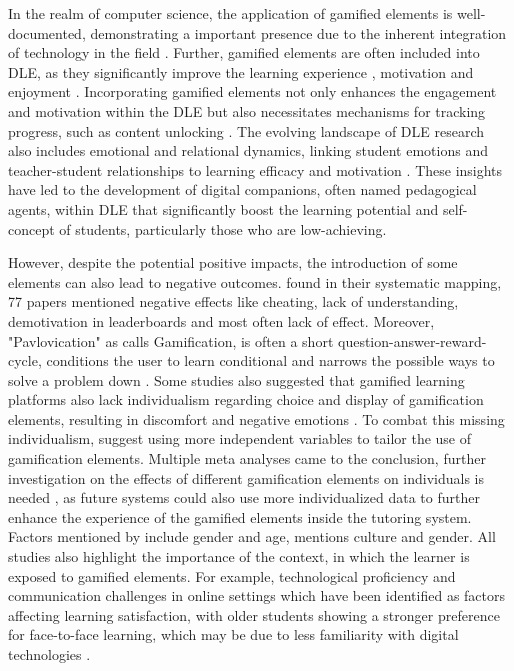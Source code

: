 In the realm of computer science, the application of gamified elements is well-documented, demonstrating a important presence due to the inherent integration of technology in the field \parencite{dichevGamifyingEducationWhat2017}.
Further, gamified elements are often included into DLE, as they significantly improve the learning experience \parencite{dermevalGaTOOntologicalModel2019}, motivation and enjoyment \parencite{gonzalezGamificationIntelligentTutoring2014, jacksonMotivationPerformanceGamebased2013}.
Incorporating gamified elements not only enhances the engagement and motivation within the DLE but also necessitates mechanisms for tracking progress, such as content unlocking \parencite{gonzalezGamificationIntelligentTutoring2014}.
The evolving landscape of DLE research also includes emotional and relational dynamics, linking student emotions and teacher-student relationships to learning efficacy and motivation \parencite{woolfAffectiveTutorsAutomatic2010}.
These insights have led to the development of digital companions, often named pedagogical agents, within DLE that significantly boost the learning potential and self-concept of students, particularly those who are low-achieving.


However, despite the potential positive impacts, the introduction of some elements can also lead to negative outcomes.
\textcite{almeidaSystematicMappingNegative2021} found in their systematic mapping, 77 papers mentioned negative effects like cheating, lack of understanding, demotivation in leaderboards and most often lack of effect.
Moreover, "Pavlovication" as \textcite{klabbersArchitectureGameScience2018} calls Gamification, is often a short question-answer-reward-cycle, conditions the user to learn conditional and narrows the possible ways to solve a problem down \parencite{klabbersArchitectureGameScience2018}.
Some studies also suggested that gamified learning platforms also lack individualism regarding choice and display of gamification elements, resulting in discomfort and negative emotions \parencite{santosDoesGenderStereotype2023}.
To combat this missing individualism, \textcite{oliveiraTailoredGamificationEducation2023,dehghanzadehUsingGamificationSupport2024} suggest using more independent variables to tailor the use of gamification elements.
Multiple meta analyses came to the conclusion, further investigation on the effects of different gamification elements on individuals is needed \textcite{oliveiraTailoredGamificationEducation2023,dehghanzadehUsingGamificationSupport2024,hamariDoesGamificationWork2014}, as future systems could also use more individualized data to further enhance the experience of the gamified elements inside the tutoring system.
Factors mentioned by \textcite{dehghanzadehUsingGamificationSupport2024} include gender and age, \textcite{oliveiraTailoredGamificationEducation2023} mentions culture and gender. All studies also highlight the importance of the context, in which the learner is exposed to gamified elements.
For example, technological proficiency and communication challenges in online settings which have been identified as factors affecting learning satisfaction, with older students showing a stronger preference for face-to-face learning, which may be due to less familiarity with digital technologies \parencite{dabajRoleGenderAge2009}.


